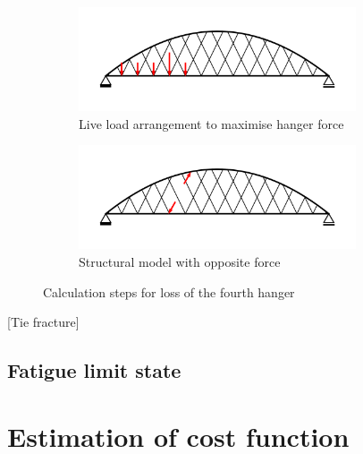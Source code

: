\begin{figure}[H]
\centering
\begin{subfigure}{0.5\textwidth}
    \centering
    \includegraphics[trim={0 0.8cm 0 0.8cm},clip, width=0.9\textwidth]{illustrations/figures/cable loss - load arrangement.png}
    \caption{Live load arrangement to maximise hanger force}
    \label{fig:Cable_Loss_1}
\end{subfigure}%
\begin{subfigure}{.5\textwidth}
    \centering
    \includegraphics[trim={0 0.8cm 0 0.8cm},clip, width=0.9\textwidth]{illustrations/figures/cable loss.png}
    \caption{Structural model with opposite force}
    \label{fig:Cable_Loss_2}
\end{subfigure}
\caption{Calculation steps for loss of the fourth hanger}
\label{fig:Cable_Loss}
\end{figure}

[Tie fracture]

\subsection{Fatigue limit state}



\section{Estimation of cost function} \label{sec:met_cost}

